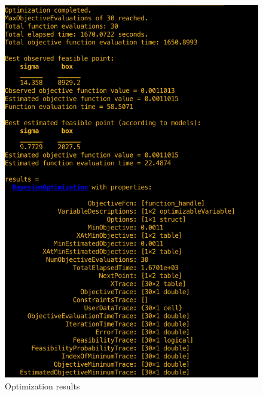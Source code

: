 \begin{figure}
\begin{center}
\includegraphics[width=15cm]{figures/optimizationResultsStuckFault}    %
\caption{Optimization results} 
\label{fig:optimizationResultsStuckFault}
\end{center}
\end{figure}

